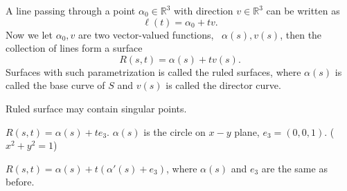 \begin{exercise}
    A line passing through a point \(\alpha_0\in\mathbb{R}^3\) 
    with direction \(v\in \mathbb{R}^3\) can be written as 
    \[
        \ell(t)=\alpha_0 + t v.    
    \]
    Now we let \(\alpha_0,v\) are two vector-valued functions,
    \ie\ \(\alpha(s),v(s)\), then the collection of lines form 
    a surface 
    \[
        R(s,t)=\alpha(s)+t v(s).    
    \]
Surfaces with such parametrization is called the ruled surfaces, 
where \(\alpha(s)\) is called the base curve of \(S\) and 
\(v(s)\) is called the director curve.
\end{exercise}
\begin{remark}
    Ruled surface may contain singular points.
\end{remark}
\begin{example}
    \(R(s,t)=\alpha(s)+t e_3\). \(\alpha(s)\) is the circle on \(x-y\)
    plane, \(e_3=(0,0,1)\). (\(x^2+y^2=1\)) 
    \begin{center}
        \end{center}
\end{example}
\begin{example}\label{a ruled surface}
    \(R(s,t)=\alpha(s)+t\left(\alpha'(s)+e_3\right)\), where \(\alpha(s)\)
     and \(e_3\) are the same as before.
    \begin{center}
    \end{center}
\end{example}
